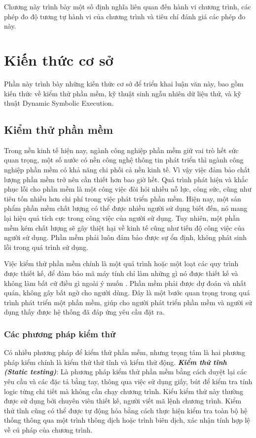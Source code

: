 Chương này trình bày một số định nghĩa liên quan đến hành vi chương trình, các phép đo độ tương tự hành vi của chương trình và tiêu chí đánh giá các phép đo này.

\section{Kiến thức cơ sở}
Phần này trình bày những kiến thức cơ sở để triển khai luận văn này,  bao gồm kiến thức về kiểm thử phần mềm, kỹ thuật sinh ngẫu nhiên dữ liệu thử, và kỹ thuật Dynamic Symbolic Execution.
\subsection{Kiểm thử phần mềm}
Trong nền kinh tế hiện nay, ngành công nghiệp phần mềm giữ vai trò hết sức quan trọng, một số nước có nền công nghệ thông tin phát triển thì ngành công nghiệp phần mềm có khả năng chi phối cả nền kinh tế. Vì vậy việc đảm bảo chất lượng phần mềm trở nên cần thiết hơn bao giờ hết. Quá trình phát hiện và khắc phục lỗi cho phần mềm là một công việc đòi hỏi nhiều nỗ lực, công sức, cũng như tiêu tốn nhiều hơn chi phí trong việc phát triển phần mềm. Hiện nay, một sản phẩm phần mềm chất lượng có thể được nhiều người sử dụng biết đến, nó mang lại hiệu quả tích cực trong công việc của người sử dụng. Tuy nhiên, một phần mềm kém chất lượng sẽ gây thiệt hại về kinh tế cũng như  tiến độ công việc của người sử dụng. Phần mềm phải luôn đảm bảo được sự ổn định, không phát sinh lỗi trong quá trình sử dụng.

Việc kiểm thử phần mềm chính là một quá trình hoặc một loạt các quy trình được thiết kế, để đảm bảo mã máy tính chỉ làm những gì nó được thiết kế và không làm bất cứ điều gì ngoài ý muốn \cite{myers2011art}. Phần mềm phải được dự đoán và nhất quán, không gây bất ngờ cho người dùng. Đây là một bước quan trọng trong quá trình phát triển một phần mềm, giúp cho người phát triển phần mềm và người sử dụng thấy được hệ thống đã đáp ứng yêu cầu đặt ra.

\subsubsection{Các phương pháp kiểm thử}
Có nhiều phương pháp để kiểm thử phần mềm, nhưng trọng tâm là hai phương pháp kiểm chính là kiểm thử thử tĩnh và kiểm thử động.
\textbf{\textit{Kiểm thử tĩnh (Static testing)}}: Là phương pháp kiểm thử phần mềm bằng cách duyệt lại các yêu cầu và các đặc tả bằng tay, thông qua việc sử dụng giấy, bút để kiểm tra tính logic từng chi tiết mà không cần chạy chương trình. Kiểu kiểm thử này thường được sử dụng bởi chuyên viên thiết kế, người viết mã lệnh chương trình. Kiểm thử tĩnh cũng có thể được tự động hóa bằng cách thực hiện kiểm tra toàn bộ hệ thống thông qua một trình thông dịch hoặc trình biên dịch, xác nhận tính hợp lệ về cú pháp của chương trình.
		
